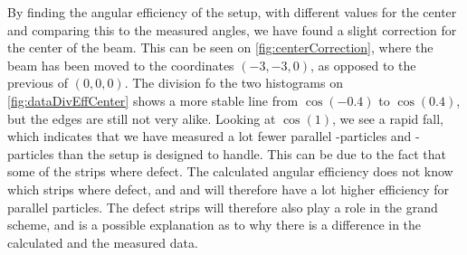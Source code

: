 By finding the angular efficiency of the setup, with different values for the center and comparing this to the measured angles, we have found a slight correction for the center of the beam. This can be seen on \cref{fig:centerCorrection}, where the beam has been moved to the coordinates $(-3, -3, 0)$, as opposed to the previous of $(0, 0, 0)$. The division fo the two histograms on \cref{fig:dataDivEffCenter} shows a more stable line from $\cos(-0.4)$ to $\cos(0.4)$, but the edges are still not very alike. Looking at $\cos(1)$, we see a rapid fall, which indicates that we have measured a lot fewer parallel \be-particles and \al-particles than the setup is designed to handle. 
This can be due to the fact that some of the strips where defect. The calculated angular efficiency does not know which strips where defect, and and will therefore have a lot higher efficiency for parallel particles. The defect strips will therefore also play a role in the grand scheme, and is a possible explanation as to why there is a difference in the calculated and the measured data. 
